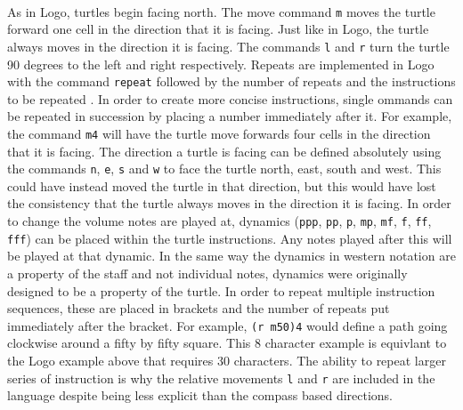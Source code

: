 \paragraph{} As in Logo, turtles begin facing north. The move command \texttt{m} moves the turtle forward one cell in the direction that it is facing. Just like in Logo, the turtle always moves in the direction it is facing. The commands \texttt{l} and \texttt{r} turn the turtle 90 degrees to the left and right respectively. Repeats are implemented in Logo with the command \texttt{repeat} followed by the number of repeats and the instructions to be repeated \cite{goldman:turtle}. In order to create more concise instructions, single ommands can be repeated in succession by placing a number immediately after it. For example, the command \texttt{m4} will have the turtle move forwards four cells in the direction that it is facing. The direction a turtle is facing can be defined absolutely using the commands \texttt{n}, \texttt{e}, \texttt{s} and \texttt{w} to face the turtle north, east, south and west. This could have instead moved the turtle in that direction, but this would have lost the consistency that the turtle always moves in the direction it is facing. In order to change the volume notes are played at, dynamics (\texttt{ppp}, \texttt{pp}, \texttt{p}, \texttt{mp}, \texttt{mf}, \texttt{f}, \texttt{ff}, \texttt{fff}) can be placed within the turtle instructions. Any notes played after this will be played at that dynamic. In the same way the dynamics in western notation are a property of the staff and not individual notes, dynamics were originally designed to be a property of the turtle. In order to repeat multiple instruction sequences, these are placed in brackets and the number of repeats put immediately after the bracket. For example, \texttt{(r m50)4} would define a path going clockwise around a fifty by fifty square. This 8 character example is equivlant to the Logo example above that requires 30 characters. The ability to repeat larger series of instruction is why the relative movements \texttt{l} and \texttt{r} are included in the language despite being less explicit than the compass based directions.

